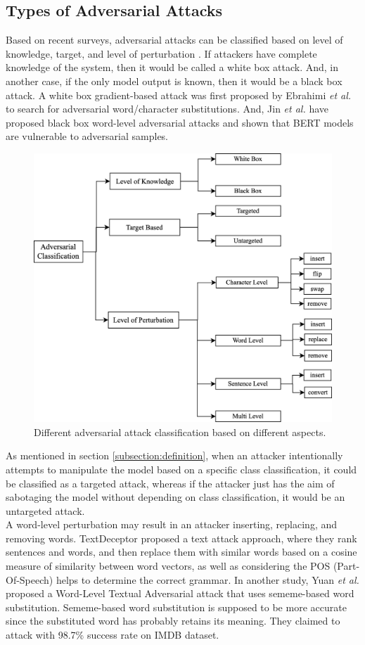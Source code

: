 \documentclass[%
	BCOR=8mm, %
	DIV=12,
	toc=bibliography, %
	toc=listof, %
	oneside, %
	egregdoesnotlikesansseriftitles, %
	]{scrbook}
\begin{document}
\subsection{Types of Adversarial Attacks}
\label{subsection:attacktypes}
Based on recent surveys, adversarial attacks can be classified based on level of knowledge, target, and level of perturbation \cite{huq_adversarial_2020-1,wang_towards_2021}. If attackers have complete knowledge of the system, then it would be called a  white box attack. And, in another case, if the only model output is known, then it would be a black box attack. A white box gradient-based attack was first proposed by Ebrahimi \textit{et al.} \cite{ebrahimi_hotflip_2018} to search for adversarial word/character substitutions. And, Jin \textit{et al.} \cite{jin_is_2020} have proposed black box word-level adversarial attacks and shown that BERT models are vulnerable to adversarial samples.
\begin{figure}[H]
    \centering
    \includegraphics[width=0.60\linewidth]{img/attack_classification.png}
    \caption[Adversarial attacks classification diagram]{Different adversarial attack classification based on different aspects.}
    \label{fig:attack_classification}
\end{figure}
As mentioned in section \ref{subsection:definition}, when an attacker intentionally attempts to manipulate the model based on a specific class classification, it could be classified as a targeted attack, whereas if the attacker just has the aim of sabotaging the model without depending on class classification, it would be an untargeted attack.\\
A word-level perturbation may result in an attacker inserting, replacing, and removing words. TextDeceptor \cite{saxena_textdecepter_2020} proposed a text attack approach, where they rank sentences and words, and then replace them with similar words based on a cosine measure of similarity between word vectors, as well as considering the POS (Part-Of-Speech) helps to determine the correct grammar. In another study, Yuan \textit{et al.} \cite{zang_word-level_2019} proposed a Word-Level Textual Adversarial attack that uses sememe-based word substitution. Sememe-based word substitution is supposed to be more accurate since the substituted word has probably retains its meaning. They claimed to attack with 98.7\% success rate on IMDB dataset.\\
\end{document}
